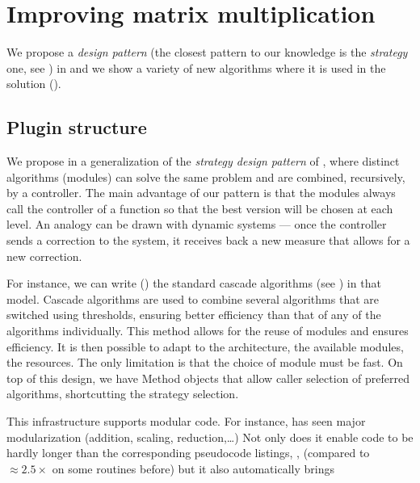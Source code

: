 \section{Improving \linbox matrix multiplication}\label{sec:matmul}
%
We propose a \emph{design pattern} (the closest pattern to our knowledge is the
\emph{strategy} one, see \cite[Fig 2.]{Cung:2006:TC}) in  and
we show a variety of new algorithms where it is used in the \mul  solution
().
%
\subsection{Plugin structure}\label{ssec:plugin}
%
We propose in  a generalization of the \emph{strategy
  design pattern} of \cite[Fig 2.]{Cung:2006:TC}, where distinct
algorithms (modules) can solve the
same problem and are combined, recursively, by a controller.
The main advantage of our pattern is that the modules always call
the controller of a function so that the best version will be chosen
at each level.
An analogy can be drawn with dynamic systems --- once the controller sends a
correction to the system, it receives back a new measure that allows for a new
correction.
%
\par

%
%
%
%
For instance, we can write () the standard cascade algorithms
(see \cite{Dumas:2008:Flas}) in that model. Cascade algorithms are used to combine
several algorithms that are switched using thresholds, ensuring better
efficiency than that of any of the algorithms individually.
%
%
%
This method allows for the reuse of modules and ensures efficiency.
It is then possible to adapt to the architecture, the available modules,
the resources. The only limitation is that the choice of module
must be fast.
%
%
On top of this design, we have Method objects that allow caller selection
of preferred algorithms, shortcutting the strategy selection.
%

%
%
\par
%
This infrastructure supports modular code. For instance,
\fflasffpack has seen major  modularization (addition, scaling,
reduction,\ldots) Not only does it enable code to be hardly longer than
the corresponding pseudocode listings, \cite{Boyer:2009:sched}, (compared to
$\approx 2.5\times$ on some routines before) but it also automatically brings
